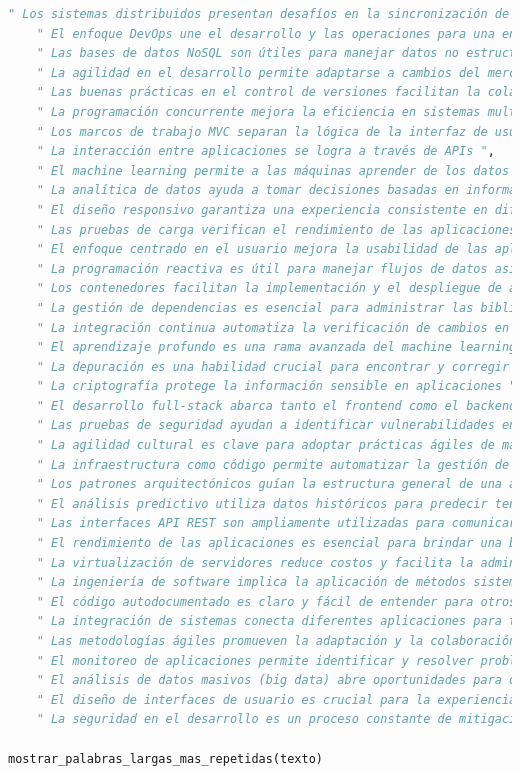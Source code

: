 \documentclass[journal, spanish]{IEEEtran}
\begin{document}
\begin{lstlisting}[language=Python]
    " Los sistemas distribuidos presentan desafíos en la sincronización de datos ",
    " El enfoque DevOps une el desarrollo y las operaciones para una entrega eficiente ",
    " Las bases de datos NoSQL son útiles para manejar datos no estructurados ",
    " La agilidad en el desarrollo permite adaptarse a cambios del mercado ",
    " Las buenas prácticas en el control de versiones facilitan la colaboración ",
    " La programación concurrente mejora la eficiencia en sistemas multiusuario ",
    " Los marcos de trabajo MVC separan la lógica de la interfaz de usuario ",
    " La interacción entre aplicaciones se logra a través de APIs ",
    " El machine learning permite a las máquinas aprender de los datos ",
    " La analítica de datos ayuda a tomar decisiones basadas en información ",
    " El diseño responsivo garantiza una experiencia consistente en diferentes dispositivos ",
    " Las pruebas de carga verifican el rendimiento de las aplicaciones ",
    " El enfoque centrado en el usuario mejora la usabilidad de las aplicaciones ",
    " La programación reactiva es útil para manejar flujos de datos asincrónicos ",
    " Los contenedores facilitan la implementación y el despliegue de aplicaciones ",
    " La gestión de dependencias es esencial para administrar las bibliotecas externas ",
    " La integración continua automatiza la verificación de cambios en el código ",
    " El aprendizaje profundo es una rama avanzada del machine learning ",
    " La depuración es una habilidad crucial para encontrar y corregir errores ",
    " La criptografía protege la información sensible en aplicaciones ",
    " El desarrollo full-stack abarca tanto el frontend como el backend ",
    " Las pruebas de seguridad ayudan a identificar vulnerabilidades en el software ",
    " La agilidad cultural es clave para adoptar prácticas ágiles de manera efectiva ",
    " La infraestructura como código permite automatizar la gestión de servidores ",
    " Los patrones arquitectónicos guían la estructura general de una aplicación ",
    " El análisis predictivo utiliza datos históricos para predecir tendencias ",
    " Las interfaces API REST son ampliamente utilizadas para comunicarse con aplicaciones ",
    " El rendimiento de las aplicaciones es esencial para brindar una buena experiencia ",
    " La virtualización de servidores reduce costos y facilita la administración ",
    " La ingeniería de software implica la aplicación de métodos sistemáticos ",
    " El código autodocumentado es claro y fácil de entender para otros programadores ",
    " La integración de sistemas conecta diferentes aplicaciones para trabajar juntas ",
    " Las metodologías ágiles promueven la adaptación y la colaboración continua ",
    " El monitoreo de aplicaciones permite identificar y resolver problemas en tiempo real ",
    " El análisis de datos masivos (big data) abre oportunidades para obtener insights ",
    " El diseño de interfaces de usuario es crucial para la experiencia del usuario ",
    " La seguridad en el desarrollo es un proceso constante de mitigación de riesgos "

mostrar_palabras_largas_mas_repetidas(texto)
\end{lstlisting}
\end{document}

